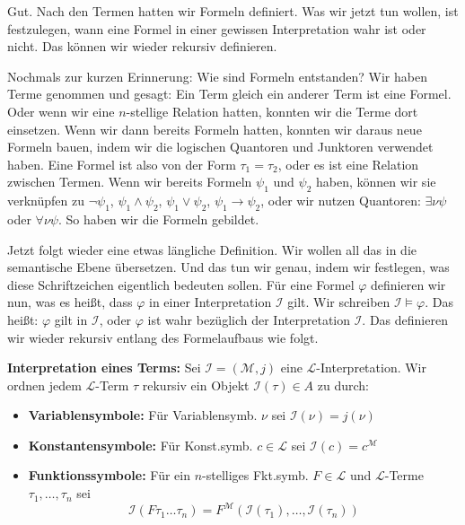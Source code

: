 \begin{spoken-clean}[00:55:26 - 00:58:03]
Gut. Nach den Termen hatten wir Formeln definiert. Was wir jetzt tun wollen, ist festzulegen, wann eine Formel in einer gewissen Interpretation wahr ist oder nicht. Das können wir wieder rekursiv definieren.

Nochmals zur kurzen Erinnerung: Wie sind Formeln entstanden? Wir haben Terme genommen und gesagt: Ein Term gleich ein anderer Term ist eine Formel. Oder wenn wir eine $n$-stellige Relation hatten, konnten wir die Terme dort einsetzen. Wenn wir dann bereits Formeln hatten, konnten wir daraus neue Formeln bauen, indem wir die logischen Quantoren und Junktoren verwendet haben. Eine Formel ist also von der Form $\tau_1 = \tau_2$, oder es ist eine Relation zwischen Termen. Wenn wir bereits Formeln $\psi_1$ und $\psi_2$ haben, können wir sie verknüpfen zu $\neg \psi_1$, $\psi_1 \land \psi_2$, $\psi_1 \lor \psi_2$, $\psi_1 \to \psi_2$, oder wir nutzen Quantoren: $\exists \nu \psi$ oder $\forall \nu \psi$. So haben wir die Formeln gebildet.

Jetzt folgt wieder eine etwas längliche Definition. Wir wollen all das in die semantische Ebene übersetzen. Und das tun wir genau, indem wir festlegen, was diese Schriftzeichen eigentlich bedeuten sollen. Für eine Formel $\varphi$ definieren wir nun, was es heißt, dass $\varphi$ in einer Interpretation $\mathcal{I}$ gilt. Wir schreiben $\mathcal{I} \models \varphi$. Das heißt: $\varphi$ gilt in $\mathcal{I}$, oder $\varphi$ ist wahr bezüglich der Interpretation $\mathcal{I}$. Das definieren wir wieder rekursiv entlang des Formelaufbaus wie folgt.
\end{spoken-clean}

\begin{math-stroke}
\textbf{Interpretation eines Terms:}
Sei $\mathcal{I} = (\mathcal{M}, j)$ eine $\mathcal{L}$-Interpretation. Wir ordnen jedem $\mathcal{L}$-Term $\tau$ rekursiv ein Objekt $\mathcal{I}(\tau) \in A$ zu durch:
\begin{itemize}
    \item \textbf{Variablensymbole:} Für Variablensymb. $\nu$ sei $\mathcal{I}(\nu) = j(\nu)$
    \item \textbf{Konstantensymbole:} Für Konst.symb. $c \in \mathcal{L}$ sei $\mathcal{I}(c) = c^{\mathcal{M}}$
    \item \textbf{Funktionssymbole:} Für ein $n$-stelliges Fkt.symb. $F \in \mathcal{L}$ und $\mathcal{L}$-Terme $\tau_1, \dots, \tau_n$ sei 
    \[ \mathcal{I}(F \tau_1 \dots \tau_n) = F^{\mathcal{M}}(\mathcal{I}(\tau_1), \dots, \mathcal{I}(\tau_n)) \]
\end{itemize}
\end{math-stroke}

